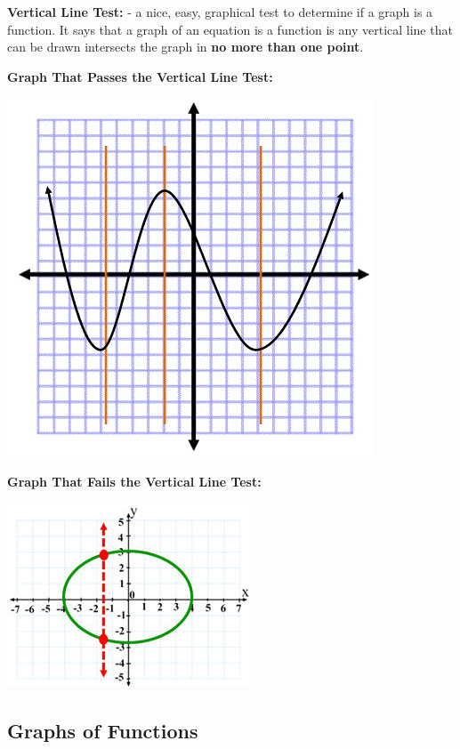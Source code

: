 \documentclass[12pt]{article}
\newenvironment{myindentpar}[1]%
     {\begin{list}{}%
             {\setlength{\leftmargin}{#1}}%
             \item[]%
     }
     {\end{list}}
\begin{document}
\textbf{Vertical Line Test:} - a nice, easy, graphical test to determine if a graph is a function. It says that a graph of an equation is a function is any vertical line that can be drawn intersects the graph in \textbf{no more than one point}.

\begin{myindentpar}{1cm}

\textbf{Graph That Passes the Vertical Line Test:}

\centerline{\includegraphics{PassesVLT.jpg}}

\newpage

\textbf{Graph That Fails the Vertical Line Test:}

\centerline{\includegraphics{FailsVLT.jpg}}

\end{myindentpar}

\subsection{Graphs of Functions}
\end{document}
